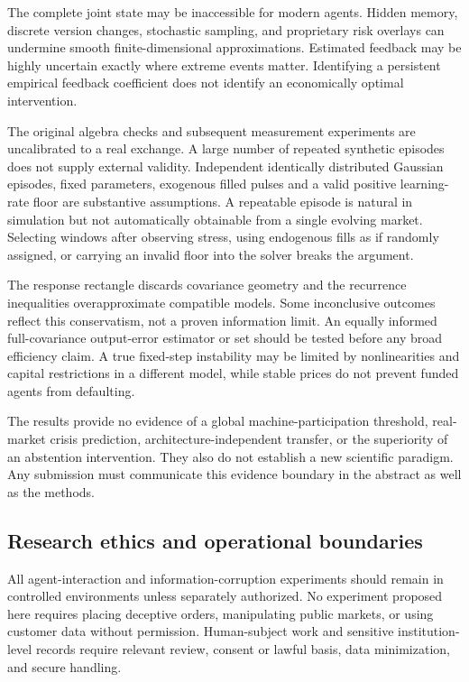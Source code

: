 \documentclass[11pt,a4paper]{article}
\theoremstyle{definition}
\theoremstyle{remark}
\begin{document}
The complete joint state may be inaccessible for modern agents. Hidden memory, discrete version changes, stochastic sampling, and proprietary risk overlays can undermine smooth finite-dimensional approximations. Estimated feedback may be highly uncertain exactly where extreme events matter. Identifying a persistent empirical feedback coefficient does not identify an economically optimal intervention.

The original algebra checks and subsequent measurement experiments are uncalibrated to a real exchange. A large number of repeated synthetic episodes does not supply external validity. Independent identically distributed Gaussian episodes, fixed parameters, exogenous filled pulses and a valid positive learning-rate floor are substantive assumptions. A repeatable episode is natural in simulation but not automatically obtainable from a single evolving market. Selecting windows after observing stress, using endogenous fills as if randomly assigned, or carrying an invalid floor into the solver breaks the argument.

The response rectangle discards covariance geometry and the recurrence inequalities overapproximate compatible models. Some inconclusive outcomes reflect this conservatism, not a proven information limit. An equally informed full-covariance output-error estimator or set should be tested before any broad efficiency claim. A true fixed-step instability may be limited by nonlinearities and capital restrictions in a different model, while stable prices do not prevent funded agents from defaulting.

The results provide no evidence of a global machine-participation threshold, real-market crisis prediction, architecture-independent transfer, or the superiority of an abstention intervention. They also do not establish a new scientific paradigm. Any submission must communicate this evidence boundary in the abstract as well as the methods.

\subsection{Research ethics and operational boundaries}
All agent-interaction and information-corruption experiments should remain in controlled environments unless separately authorized. No experiment proposed here requires placing deceptive orders, manipulating public markets, or using customer data without permission. Human-subject work and sensitive institution-level records require relevant review, consent or lawful basis, data minimization, and secure handling.
\end{document}
